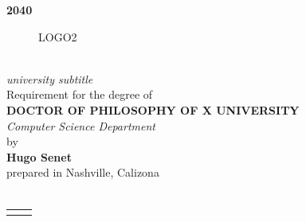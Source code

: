 \documentclass[10pt]{book}
\begin{document}


\newlength{\plarg}
\setlength{\plarg}{8cm}
\newlength{\glarg}
\setlength{\glarg}{14cm}
\newlength{\Glarg}
\setlength{\Glarg}{15cm}

\begin{titlepage}
\thispagestyle{empty}

\vspace{-1cm}
\begin{minipage}{\glarg}
\vspace{-4.5cm}
{\color{light_gray}\large\hfill \bf 2040}
\end{minipage}
\vspace{-2cm}
\begin{figure}[htp]
\raisebox{14mm}{LOGO1}\hfill LOGO2
\end{figure}

\begin{center}
\begin{minipage}{\glarg}
\vspace{0.5cm}
\\ \vspace{0mm}\emph{\Large university subtitle}\\ \vspace{0.5cm}
{\Large Requirement for the degree of}\\ \vspace{2mm}
{\Large\bf DOCTOR OF PHILOSOPHY OF X UNIVERSITY}\\ \vspace{0.4cm}
\emph{\Large Computer Science Department}\\ \vspace{2mm}
{\Large by} \\ \vspace{3mm}
{\Huge\bf Hugo Senet}\\ \vspace{0.4cm}
{\Large prepared in Nashville, Calizona}\vspace{0.3cm}
\\
\hspace{-20mm}{\rule{\Glarg}{1pt}}\\
\vspace{8mm}

\begin{tabular}{p{7cm}p{10cm}}
\begin{minipage}{\plarg}
\vspace{-4cm}
\hspace{-1.8cm}{\huge\bf Protocoles}\vspace{5mm}


\end{minipage}
\end{tabular}
\end{minipage}
\end{center}
\end{titlepage}
\end{document}
